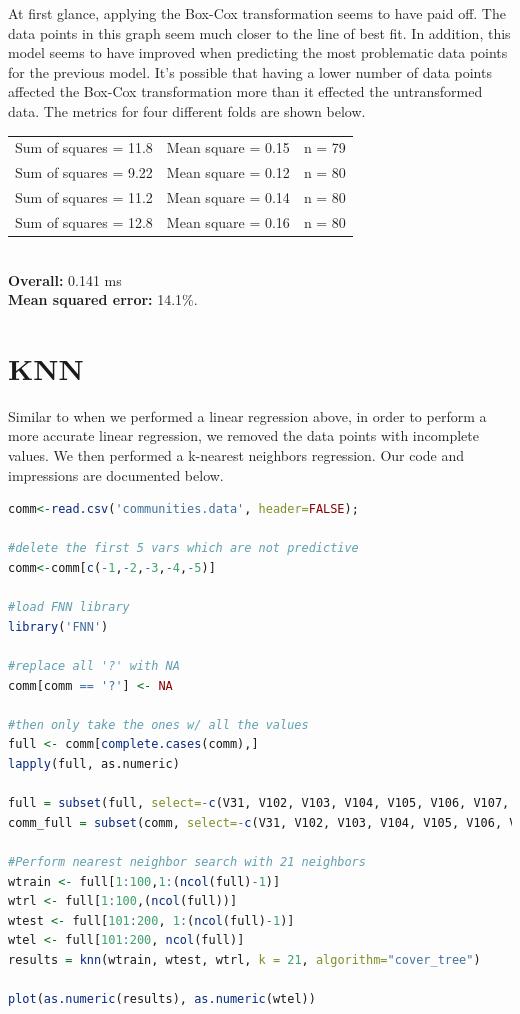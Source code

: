 \documentclass{article}
\begin{document}
At first glance, applying the Box-Cox transformation seems to have paid off. The
data points in this graph seem much closer to the line of best fit. In addition,
this model seems to have improved when predicting the most problematic data
points for the previous model. It's possible that having a lower number of data
points affected the Box-Cox transformation more than it effected the
untransformed data. The metrics for four different folds are shown below.\\ 
\noindent
\begin{tabular}{l c r}
  Sum of squares = 11.8 & Mean square = 0.15 & n = 79\\
  Sum of squares = 9.22 & Mean square = 0.12 & n = 80\\ 
  Sum of squares = 11.2 & Mean square = 0.14 & n = 80\\ 
  Sum of squares = 12.8 & Mean square = 0.16 & n = 80\\ 
\end{tabular}\\

\noindent
\textbf{Overall:} 0.141 ms \\
\textbf{Mean squared error:} 14.1\%.

\section{KNN}
Similar to when we performed a linear regression above, in order to perform a
more accurate linear regression, we removed the data points with incomplete
values. We then performed a k-nearest neighbors regression. Our code and
impressions are documented below.

\begin{lstlisting}[language=r]
comm<-read.csv('communities.data', header=FALSE);

#delete the first 5 vars which are not predictive
comm<-comm[c(-1,-2,-3,-4,-5)] 

#load FNN library
library('FNN')

#replace all '?' with NA
comm[comm == '?'] <- NA

#then only take the ones w/ all the values
full <- comm[complete.cases(comm),]
lapply(full, as.numeric)

full = subset(full, select=-c(V31, V102, V103, V104, V105, V106, V107, V108, V109, V111, V110, V112, V113, V114, V115, V116, V117, V118, V122, V123, V124, V125, V127))
comm_full = subset(comm, select=-c(V31, V102, V103, V104, V105, V106, V107, V108, V109, V111, V110, V112, V113, V114, V115, V116, V117, V118, V122, V123, V124, V125, V127))

#Perform nearest neighbor search with 21 neighbors
wtrain <- full[1:100,1:(ncol(full)-1)]
wtrl <- full[1:100,(ncol(full))]
wtest <- full[101:200, 1:(ncol(full)-1)]
wtel <- full[101:200, ncol(full)]
results = knn(wtrain, wtest, wtrl, k = 21, algorithm="cover_tree")

plot(as.numeric(results), as.numeric(wtel))
\end{lstlisting}
\end{document}

